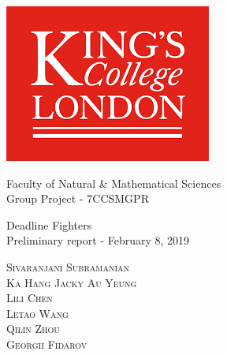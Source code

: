 \begin{center}
    \includegraphics[scale=1]{images/Logo.png}
\end{center}
\vspace{50px}
\begin{center}
        \Huge{Faculty of Natural \& Mathematical Sciences}\\
        \vspace{50px}
		\Huge{Group Project - 7CCSMGPR}
\end{center}
\begin{center}
		\Huge Deadline Fighters \\
    \vspace{20px}
		\LARGE Preliminary report - February 8, 2019 \\
\end{center}
\vspace{50px}
\begin{center}
		\textsc{\LARGE Sivaranjani Subramanian \\
        \LARGE Ka Hang Jacky Au Yeung \\
        \LARGE Lili Chen \\
        \LARGE Letao Wang \\
        \LARGE Qilin Zhou \\
        \LARGE Georgii Fidarov\\}
\end{center}
